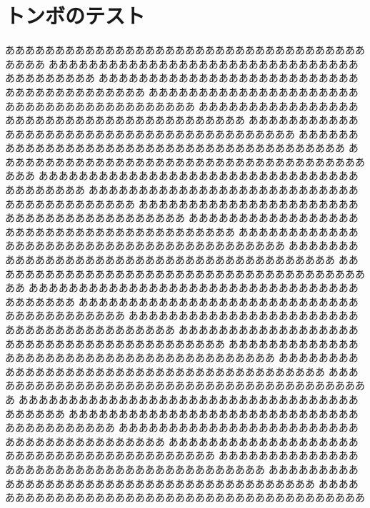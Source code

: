 \documentclass[twocolumn]{bxjsarticle}
\begin{document}
\addtolength{\pdfpagewidth}{2in}
\addtolength{\pdfpageheight}{2in}

\section{トンボのテスト}
ああああああああああああああああああああああああああああああああああああああああ
ああああああああああああああああああああああああああああああああああああああああ
ああああああああああああああああああああああああああああああああああああああああ
ああああああああああああああああああああああああああああああああああああああああ
ああああああああああああああああああああああああああああああああああああああああ
ああああああああああああああああああああああああああああああああああああああああ
ああああああああああああああああああああああああああああああああああああああああ
ああああああああああああああああああああああああああああああああああああああああ
ああああああああああああああああああああああああああああああああああああああああ
ああああああああああああああああああああああああああああああああああああああああ
ああああああああああああああああああああああああああああああああああああああああ
ああああああああああああああああああああああああああああああああああああああああ
ああああああああああああああああああああああああああああああああああああああああ
ああああああああああああああああああああああああああああああああああああああああ
ああああああああああああああああああああああああああああああああああああああああ
ああああああああああああああああああああああああああああああああああああああああ
ああああああああああああああああああああああああああああああああああああああああ
ああああああああああああああああああああああああああああああああああああああああ
ああああああああああああああああああああああああああああああああああああああああ
ああああああああああああああああああああああああああああああああああああああああ
ああああああああああああああああああああああああああああああああああああああああ
ああああああああああああああああああああああああああああああああああああああああ
ああああああああああああああああああああああああああああああああああああああああ
ああああああああああああああああああああああああああああああああああああああああ
ああああああああああああああああああああああああああああああああああああああああ
ああああああああああああああああああああああああああああああああああああああああ
ああああああああああああああああああああああああああああああああああああああああ
ああああああああああああああああああああああああああああああああああああああああ
ああああああああああああああああああああああああああああああああああああああああ
\end{document}

